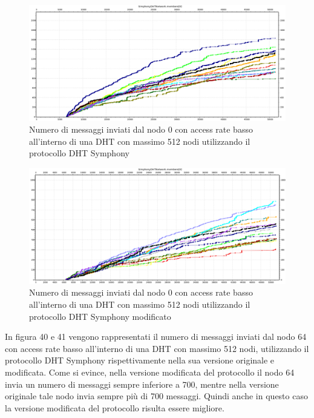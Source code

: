 \documentclass[	
	DIV=calc,
	paper=a4,
	fontsize=11pt,
	onecolumn
]{scrartcl} %
\begin{document}
	\begin{figure}[H]
		\centering
		\includegraphics[scale=0.35]	{SymphonyDHT/plots/MessagesSentByEveryNode/512_Nodes_SlowAccess/SymphonyDHT_512Nodes_SlowAccess_Node0.png}
		\caption{Numero di messaggi inviati dal nodo 0 con access rate basso all'interno di una DHT con massimo 512 nodi utilizzando il protocollo DHT Symphony}
		\label{Figura 38}
	\end{figure}
	\begin{figure}[H]
		\centering
		\includegraphics[scale=0.35]	{SymphonyDHTMod/plots/MessagesSentByEveryNode/512_Nodes_SlowAccess/SymphonyDHTMod_512Nodes_SlowAccess_Node0.png}
		\caption{Numero di messaggi inviati dal nodo 0 con access rate basso all'interno di una DHT con massimo 512 nodi utilizzando il protocollo DHT Symphony modificato}
		\label{Figura 39}
	\end{figure}			
		
	In figura 40 e 41 vengono rappresentati il numero di messaggi inviati dal nodo 64 con access rate basso all'interno di una DHT con massimo 512 nodi, utilizzando il protocollo DHT Symphony rispettivamente nella sua versione originale e modificata. Come si evince, nella versione modificata del protocollo il nodo 64 invia un numero di messaggi sempre inferiore a 700, mentre nella versione originale tale nodo invia sempre più di 700 messaggi. Quindi anche in questo caso la versione modificata del protocollo risulta essere migliore. 
	
\end{document}
